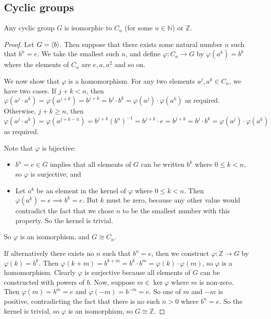 \subsection{Cyclic groups}
\begin{theorem}
	Any cyclic group \(G\) is isomorphic to \(C_n\) (for some \(n \in \mathbb N\)) or \(\mathbb Z\).
\end{theorem}
\begin{proof}
	Let \(G = \langle{} b \rangle\).
	Then suppose that there exists some natural number \(n\) such that \(b^n = e\).
	We take the smallest such \(n\), and define \(\varphi: C_n \to G\) by \(\varphi(a^k) = b^k\) where the elements of \(C_n\) are \(e, a, a^2\) and so on.

	We now show that \(\varphi\) is a homomorphism.
	For any two elements \(a^j, a^k \in C_n\), we have two cases.
	If \(j + k < n\), then \(\varphi(a^j \cdot a^k) = \varphi(a^{j+k}) = b^{j+k} = b^j \cdot b^k = \varphi(a^j) \cdot \varphi(a^k)\) as required.
	Otherwise, \(j + k \geq n\), then \(\varphi(a^j \cdot a^k) = \varphi(a^{j+k-n}) = b^{j+k}(b^n)^{-1} = b^{j+k}\cdot e = b^{j+k} = b^j \cdot b^k = \varphi(a^j) \cdot \varphi(a^k)\) as required.

	Note that \(\varphi\) is bijective:
	\begin{itemize}
		\item \(b^n = e \in G\) implies that all elements of \(G\) can be written \(b^k\) where \(0 \leq k < n\), so \(\varphi\) is surjective; and
		\item Let \(a^k\) be an element in the kernel of \(\varphi\) where \(0 \leq k < n\).
		      Then \(\varphi(a^k) = e \implies b^k = e\).
		      But \(k\) must be zero, because any other value would contradict the fact that we chose \(n\) to be the smallest number with this property.
		      So the kernel is trivial.
	\end{itemize}
	So \(\varphi\) is an isomorphism, and \(G \cong C_n\).

	If alternatively there exists no \(n\) such that \(b^n = e\), then we construct \(\varphi: \mathbb Z \to G\) by \(\varphi(k) = b^k\).
	Then \(\varphi(k + m) = b^{k+m} = b^k \cdot b^m = \varphi(k) \cdot \varphi(m)\), so \(\varphi\) is a homomorphism.
	Clearly \(\varphi\) is surjective because all elements of \(G\) can be constructed with powers of \(b\).
	Now, suppose \(m \in \ker \varphi\) where \(m\) is non-zero.
	Then \(\varphi(m) = b^m = e\) and \(\varphi(-m) = b^{-m} = e\).
	So one of \(m\) and \(-m\) is positive, contradicting the fact that there is no such \(n>0\) where \(b^n = e\).
	So the kernel is trivial, so \(\varphi\) is an isomorphism, so \(G \cong \mathbb Z\).
\end{proof}

